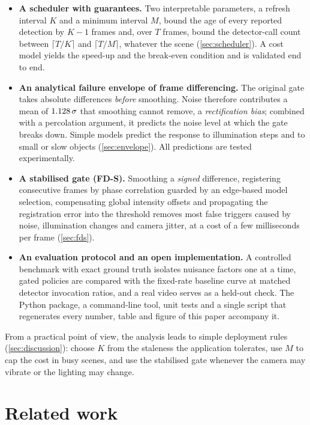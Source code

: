 \documentclass[12pt,a4paper]{article}
\theoremstyle{plain}
\theoremstyle{definition}
\newcommand{\FDS}{FD-S}
\begin{document}
\begin{itemize}
\item \textbf{A scheduler with guarantees.} Two interpretable parameters, a refresh interval $K$ and a minimum interval $M$, bound the age of every reported detection by $K-1$ frames and, over $T$ frames, bound the detector-call count between $\lceil T/K\rceil$ and $\lceil T/M\rceil$, whatever the scene (\cref{sec:scheduler}). A cost model yields the speed-up and the break-even condition and is validated end to end.
\item \textbf{An analytical failure envelope of frame differencing.} The original gate takes absolute differences \emph{before} smoothing. Noise therefore contributes a mean of $1.128\,\sigma$ that smoothing cannot remove, a \emph{rectification bias}; combined with a percolation argument, it predicts the noise level at which the gate breaks down. Simple models predict the response to illumination steps and to small or slow objects (\cref{sec:envelope}). All predictions are tested experimentally.
\item \textbf{A stabilised gate (\FDS).} Smoothing a \emph{signed} difference, registering consecutive frames by phase correlation guarded by an edge-based model selection, compensating global intensity offsets and propagating the registration error into the threshold removes most false triggers caused by noise, illumination changes and camera jitter, at a cost of a few milliseconds per frame (\cref{sec:fds}).
\item \textbf{An evaluation protocol and an open implementation.} A controlled benchmark with exact ground truth isolates nuisance factors one at a time, gated policies are compared with the fixed-rate baseline curve at matched detector invocation ratios, and a real video serves as a held-out check. The Python package, a command-line tool, unit tests and a single script that regenerates every number, table and figure of this paper accompany it.
\end{itemize}

\noindent From a practical point of view, the analysis leads to simple deployment rules (\cref{sec:discussion}): choose $K$ from the staleness the application tolerates, use $M$ to cap the cost in busy scenes, and use the stabilised gate whenever the camera may vibrate or the lighting may change.


\newpage

\section{Related work}\label{sec:related}
\end{document}
